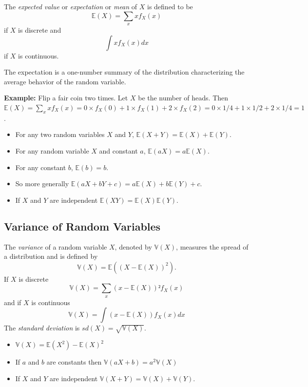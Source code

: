 \documentclass[
]{book}
\providecommand{\tightlist}{%
  \setlength{\itemsep}{0pt}\setlength{\parskip}{0pt}}
\theoremstyle{definition}
\theoremstyle{definition}
\theoremstyle{definition}
\theoremstyle{definition}
\theoremstyle{remark}
\begin{document}
The \emph{expected value} or \emph{expectation} or \emph{mean} of \(X\) is defined to be
\[
\mathbb{E}(X)=\sum_x xf_X(x)
\]
if \(X\) is discrete and
\[
\int xf_X(x)dx
\]
if \(X\) is continuous.

The expectation is a one-number summary of the distribution characterizing the average behavior of the random variable.

\textbf{Example:} Flip a fair coin two times. Let \(X\) be the number of heads. Then \(\mathbb{E}(X)=\sum_{x}xf_X(x)= 0\times f_X(0)+1\times f_X(1) + 2\times f_X(2)=0\times 1/4 + 1 \times 1/2 +2 \times 1/4 = 1\).

\begin{itemize}
\tightlist
\item
  For any two random variables \(X\) and \(Y\), \(\mathbb{E}(X+Y)=\mathbb{E}(X)+\mathbb{E}(Y)\).
\item
  For any random variable \(X\) and constant \(a\), \(\mathbb{E}(aX)=a\mathbb{E}(X)\).
\item
  For any constant \(b\), \(\mathbb{E}(b)=b\).
\item
  So more generally \(\mathbb{E}(aX+bY+c)=a\mathbb{E}(X)+b\mathbb{E}(Y)+c\).
\item
  If \(X\) and \(Y\) are independent \(\mathbb{E}(XY)=\mathbb{E}(X)\mathbb{E}(Y)\).
\end{itemize}

\hypertarget{variance-of-random-variables}{%
\subsection{Variance of Random Variables}\label{variance-of-random-variables}}

The \emph{variance} of a random variable \(X\), denoted by \(\mathbb{V}(X)\), measures the spread of a distribution and is defined by
\[
\mathbb{V}(X)=\mathbb{E}((X-\mathbb{E}(X))^2).
\]
If \(X\) is discrete
\[
\mathbb{V}(X)=\sum_x(x-\mathbb{E}(X))²f_X(x)
\]
and if \(X\) is continuous
\[
\mathbb{V}(X)=\int(x-\mathbb{E}(X))f_X(x)dx
\]
The \emph{standard deviation} is \(sd(X)=\sqrt{\mathbb{V}(X)}\).

\begin{itemize}
\tightlist
\item
  \(\mathbb{V}(X)=\mathbb{E}(X^2)-\mathbb{E}(X)^2\)
\item
  If \(a\) and \(b\) are constants then \(\mathbb{V}(aX+b)=a^2\mathbb{V}(X)\)
\item
  If \(X\) and \(Y\) are independent \(\mathbb{V}(X+Y)=\mathbb{V}(X)+\mathbb{V}(Y)\).
\end{itemize}
\end{document}
